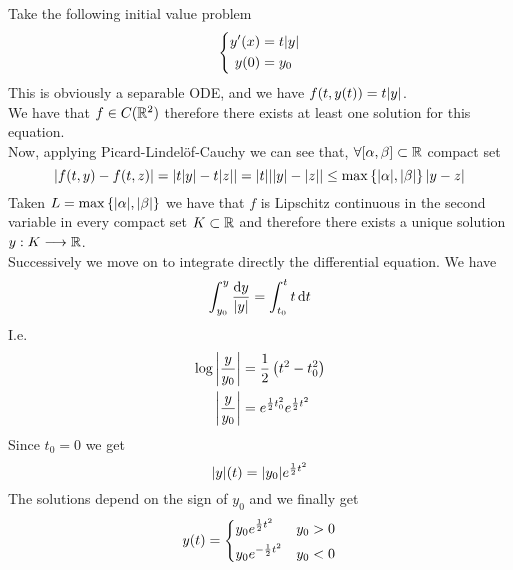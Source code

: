 \documentclass[../complete.tex]{subfiles}
\begin{document}
\begin{eg}
	Take the following initial value problem
	\begin{equation*}
		\left\{ \begin{aligned}
				y'(x)&=t\abs{y}\\
				y(0)&=y_0
		\end{aligned}\right.
	\end{equation*}
	This is obviously a separable ODE, and we have $f(t,y(t))=t\abs{y}$.\\
	We have that $f\in C(\mathbb{R}^2)$ therefore there exists at least one solution for this equation.\\
	Now, applying Picard-Lindelöf-Cauchy we can see that, $\forall [\alpha,\beta]\subset\mathbb{R}$ compact set
	\begin{equation*}
		\abs{f(t,y)-f(t,z)}=\abs{t\abs{y}-t\abs{z}}=\abs{t}\abs{\abs{y}-\abs{z}}\le\max\left\{ \abs{\alpha},\abs{\beta} \right\}\abs{y-z}
	\end{equation*}
	Taken $L=\max\left\{ \abs{\alpha},\abs{\beta} \right\}$ we have that $f$ is Lipschitz continuous in the second variable in every compact set $K\subset\mathbb{R}$ and therefore there exists a unique solution $y:K\overset{}{\longrightarrow}\mathbb{R}$.\\
	Successively we move on to integrate directly the differential equation. We have
	\begin{equation*}
		\int_{y_0}^{y}\frac{\operatorname{d\!} y}{\abs{y}}=\int_{t_0}^{t}t\operatorname{d\!} t
	\end{equation*}
	I.e.
	\begin{equation*}
		\begin{aligned}
			\log\abs{\frac{y}{y_0}}&=\frac{1}{2}\left( t^2-t_0^2 \right)\\
			\abs{\frac{y}{y_0}}&=e^{\frac{1}{2}t_0^2}e^{\frac{1}{2}t^2}
		\end{aligned}
	\end{equation*}
	Since $t_0=0$ we get
	\begin{equation*}
		\abs{y}(t)=\abs{y_0}e^{\frac{1}{2}t^2}
	\end{equation*}
	The solutions depend on the sign of $y_0$ and we finally get
	\begin{equation*}
		y(t)=\begin{dcases}y_0e^{\frac{1}{2}t^2}&y_0>0\\y_0e^{-\frac{1}{2}t^2}&y_0<0\end{dcases}
	\end{equation*}
\end{eg}
\end{document}
